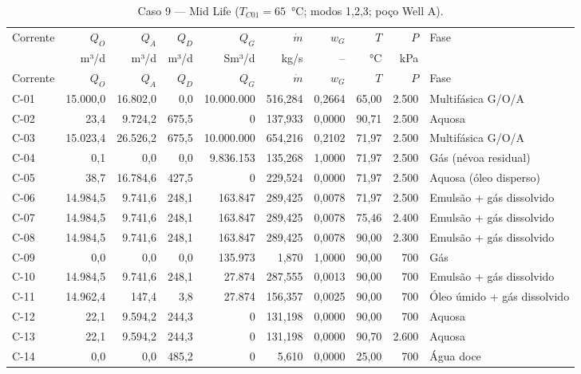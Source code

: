 \documentclass[11pt,a4paper]{article}
\numberwithin{equation}{section}
\numberwithin{table}{section}
\numberwithin{figure}{section}
\begin{document}
{\footnotesize\setlength{\tabcolsep}{3pt}\begin{longtable}{lrrrrrrrrL{2.5cm}}
\caption{Caso 9 --- Mid Life ($T_{C01}=65$~°C; modos 1,2,3; poço Well A).}\\\toprule
Corrente & $Q_O$ & $Q_A$ & $Q_D$ & $Q_G$ & $\dot m$ & $w_G$ & $T$ & $P$ & Fase\\ & m³/d & m³/d & m³/d & Sm³/d & kg/s & -- & °C & kPa & \\\midrule\endfirsthead
\toprule Corrente & $Q_O$ & $Q_A$ & $Q_D$ & $Q_G$ & $\dot m$ & $w_G$ & $T$ & $P$ & Fase\\\midrule\endhead
C-01 & 15.000,0 & 16.802,0 & 0,0 & 10.000.000 & 516,284 & 0,2664 & 65,00 & 2.500 & {\scriptsize Multifásica G/O/A}\\
C-02 & 23,4 & 9.724,2 & 675,5 & 0 & 137,933 & 0,0000 & 90,71 & 2.500 & {\scriptsize Aquosa}\\
C-03 & 15.023,4 & 26.526,2 & 675,5 & 10.000.000 & 654,216 & 0,2102 & 71,97 & 2.500 & {\scriptsize Multifásica G/O/A}\\
C-04 & 0,1 & 0,0 & 0,0 & 9.836.153 & 135,268 & 1,0000 & 71,97 & 2.500 & {\scriptsize Gás (névoa residual)}\\
C-05 & 38,7 & 16.784,6 & 427,5 & 0 & 229,524 & 0,0000 & 71,97 & 2.500 & {\scriptsize Aquosa (óleo disperso)}\\
C-06 & 14.984,5 & 9.741,6 & 248,1 & 163.847 & 289,425 & 0,0078 & 71,97 & 2.500 & {\scriptsize Emulsão + gás dissolvido}\\
C-07 & 14.984,5 & 9.741,6 & 248,1 & 163.847 & 289,425 & 0,0078 & 75,46 & 2.400 & {\scriptsize Emulsão + gás dissolvido}\\
C-08 & 14.984,5 & 9.741,6 & 248,1 & 163.847 & 289,425 & 0,0078 & 90,00 & 2.300 & {\scriptsize Emulsão + gás dissolvido}\\
C-09 & 0,0 & 0,0 & 0,0 & 135.973 & 1,870 & 1,0000 & 90,00 & 700 & {\scriptsize Gás}\\
C-10 & 14.984,5 & 9.741,6 & 248,1 & 27.874 & 287,555 & 0,0013 & 90,00 & 700 & {\scriptsize Emulsão + gás dissolvido}\\
C-11 & 14.962,4 & 147,4 & 3,8 & 27.874 & 156,357 & 0,0025 & 90,00 & 700 & {\scriptsize Óleo úmido + gás dissolvido}\\
C-12 & 22,1 & 9.594,2 & 244,3 & 0 & 131,198 & 0,0000 & 90,00 & 700 & {\scriptsize Aquosa}\\
C-13 & 22,1 & 9.594,2 & 244,3 & 0 & 131,198 & 0,0000 & 90,70 & 2.600 & {\scriptsize Aquosa}\\
C-14 & 0,0 & 0,0 & 485,2 & 0 & 5,610 & 0,0000 & 25,00 & 700 & {\scriptsize Água doce}\\

\end{longtable}}
\end{document}
